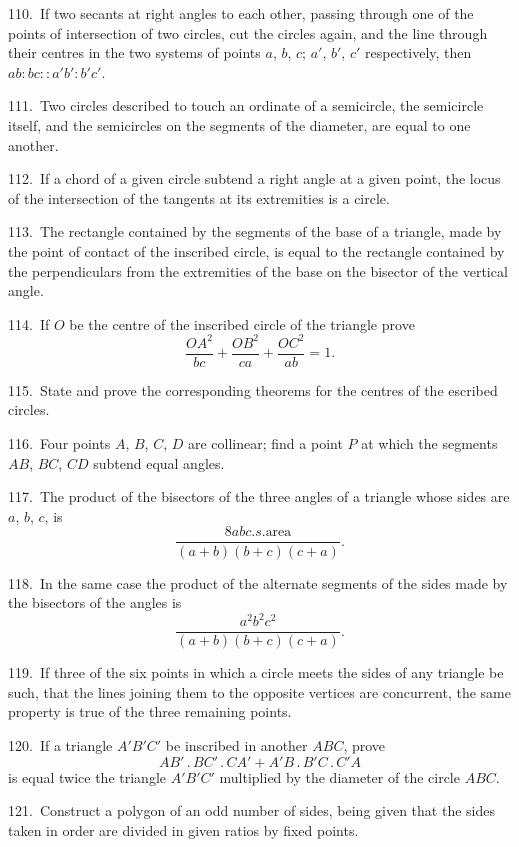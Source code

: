 \documentclass[oneside]{book}
\begin{document}
\begin{footnotesize}
110.~If two secants at right angles to each other, passing through
one of the points of intersection of two circles, cut the circles
again, and the line through their centres in the two systems of
points $a$, $b$, $c$; $a'$, $b'$, $c'$ respectively, then $ab : bc : : a'b' : b'c'$.

111.~Two circles described to touch an ordinate of a semicircle,
the semicircle itself, and the semicircles on the segments
of the diameter, are equal to one another.

112.~If a chord of a given circle subtend a right angle at
a given point, the locus of the intersection of the tangents at
its extremities is a circle.

113.~The rectangle contained by the segments of the base of a
triangle, made by the point of contact of the inscribed circle, is
equal to the rectangle contained by the perpendiculars from the
extremities of the base on the bisector of the vertical angle.


114.~If $O$ be the centre of the inscribed circle of the triangle
prove
\[
\frac{OA^{2}}{bc} + \frac{OB^{2}}{ca} + \frac{OC^{2}}{ab} = 1.
\]

115.~State and prove the corresponding theorems for the
centres of the escribed circles.

116.~Four points $A$, $B$, $C$, $D$ are collinear; find a point $P$ at
which the segments $AB$, $BC$, $CD$ subtend equal angles.

117.~The product of the bisectors of the three angles of a triangle
whose sides are $a$, $b$, $c$, is
\[
  \frac{8 abc.s.\text{area} }
       {  (a+b)(b+c)(c+a)   }.
\]

118.~In the same case the product of the alternate segments of
the sides made by the bisectors of the angles is
\[
  \frac{ a^2 b^2 c^2 }
       {  (a+b)(b+c)(c+a)              }.
\]

119.~If three of the six points in which a circle meets the sides
of any triangle be such, that the lines joining them to the opposite
vertices are concurrent, the same property is true of the three
remaining points.

120.~If a triangle $A'B'C'$ be inscribed in another $ABC$, prove
\[
AB'\,.\,BC'\,.\,CA' + A'B\,.\,B'C\,.\,C'A
\]
is equal twice the triangle $A'B'C'$ multiplied by the diameter of
the circle $ABC$.

121.~Construct a polygon of an odd number of sides, being
given that the sides taken in order are divided in given ratios
by fixed points.


\end{footnotesize}
\end{document}
